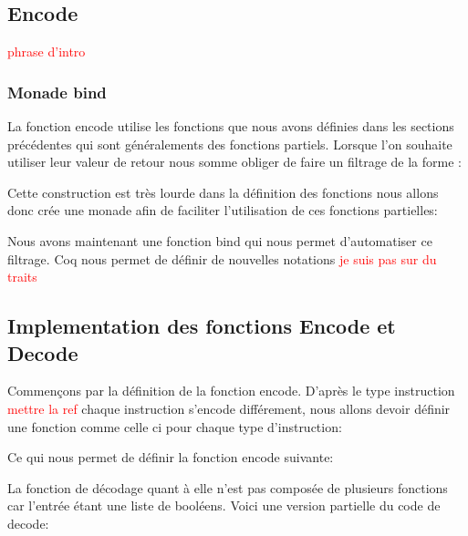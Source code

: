 \documentclass {article}
\newcommand{\codefrom}[3]
           {}
\theoremstyle{definition}
\theoremstyle{remark}
\newcommand{\todo}[1]{\textcolor{red}{#1}}
\begin{document}
\subsection{Encode}

\todo{phrase d'intro}

\subsubsection{Monade bind}

La fonction encode utilise les fonctions que nous avons définies dans les sections précédentes qui sont généralements
des fonctions partiels. Lorsque l'on souhaite utiliser leur valeur de retour nous somme obliger de faire un
filtrage de la forme :

\codefrom{rapport}{definitions}{pattern_matching}

Cette construction est très lourde dans la définition des fonctions nous allons donc crée une monade
afin de faciliter l'utilisation de ces fonctions partielles:

\codefrom{src}{encode}{monade}

Nous avons maintenant une fonction bind qui nous permet d'automatiser ce filtrage. Coq nous permet de
définir de nouvelles notations \todo{je suis pas sur du traits}

\codefrom{src}{encode}{notation}






\subsection{Implementation des fonctions Encode et Decode}

Commençons par la définition de la fonction encode. D'après le type instruction \todo{mettre la ref}
chaque instruction s'encode différement, nous allons devoir définir une fonction comme celle ci
pour chaque type d'instruction:

\codefrom{src}{encode}{encode_t_n}

Ce qui nous permet de définir la fonction encode suivante:

\codefrom{src}{encode}{encode}

La fonction de décodage quant à elle n'est pas composée de plusieurs fonctions car l'entrée
étant une liste de booléens.
Voici une version partielle du code de decode:

\codefrom{src}{encode}{decode}
\end{document}
